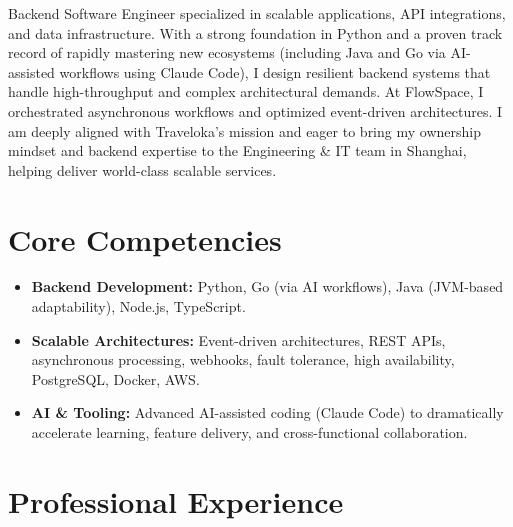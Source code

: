 \documentclass[11pt,a4paper,sans]{moderncv}
\begin{document}
\makecvtitle

Backend Software Engineer specialized in scalable applications, API integrations, and data infrastructure. With a strong foundation in Python and a proven track record of rapidly mastering new ecosystems (including Java and Go via AI-assisted workflows using Claude Code), I design resilient backend systems that handle high-throughput and complex architectural demands. At FlowSpace, I orchestrated asynchronous workflows and optimized event-driven architectures. I am deeply aligned with Traveloka's mission and eager to bring my ownership mindset and backend expertise to the Engineering \& IT team in Shanghai, helping deliver world-class scalable services.

\section{Core Competencies}
\begin{itemize}
\item \textbf{Backend Development:} Python, Go (via AI workflows), Java (JVM-based adaptability), Node.js, TypeScript.
\item \textbf{Scalable Architectures:} Event-driven architectures, REST APIs, asynchronous processing, webhooks, fault tolerance, high availability, PostgreSQL, Docker, AWS.
\item \textbf{AI \& Tooling:} Advanced AI-assisted coding (Claude Code) to dramatically accelerate learning, feature delivery, and cross-functional collaboration.
\end{itemize}

\section{Professional Experience}
\end{document}

